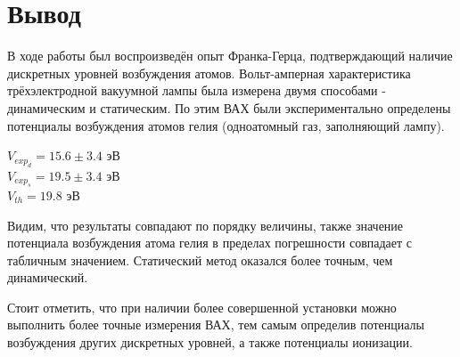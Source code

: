 \documentclass[a4paper, 12pt]{article}
\begin{document}
\newpage

\section{Вывод}

В ходе работы был воспроизведён опыт Франка-Герца, подтверждающий наличие дискретных уровней возбуждения атомов. Вольт-амперная характеристика трёхэлектродной вакуумной лампы была измерена двумя способами - динамическим и статическим. По этим ВАХ были экспериментально определены потенциалы возбуждения атомов гелия (одноатомный газ, заполняющий лампу). 
\begin{center}
    $V_{{exp}_d} = 15.6 \pm 3.4$  эВ \\
    $V_{{exp}_s} = 19.5 \pm 3.4$ эВ \\
    $V_{th} = 19.8 $ эВ
\end{center}
Видим, что результаты совпадают по порядку величины, также значение потенциала возбуждения атома гелия в пределах погрешности совпадает с табличным значением. Статический метод оказался более точным, чем динамический. \par
Стоит отметить, что при наличии более совершенной установки можно выполнить более точные измерения ВАХ, тем самым определив потенциалы возбуждения других дискретных уровней, а также потенциалы ионизации.
\end{document}
